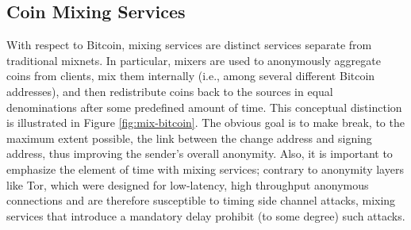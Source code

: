 

\subsection{Coin Mixing Services}

With respect to Bitcoin, mixing services are distinct services separate from traditional mixnets. In particular, mixers are used to anonymously aggregate coins from clients, mix them internally (i.e., among several different Bitcoin addresses), and then redistribute coins back to the sources in equal denominations after some predefined amount of time. This conceptual distinction is illustrated in Figure \ref{fig:mix-bitcoin}. The obvious goal is to make break, to the maximum extent possible, the link between the change address and signing address, thus improving the sender's overall anonymity. Also, it is important to emphasize the element of time with mixing services; contrary to anonymity layers like Tor, which were designed for low-latency, high throughput anonymous connections and are therefore susceptible to timing side channel attacks, mixing services that introduce a mandatory delay prohibit (to some degree) such attacks.

